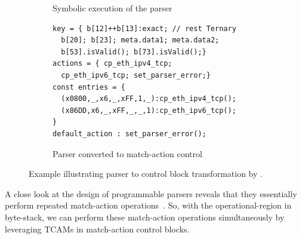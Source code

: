 \documentclass[letterpaper,twocolumn,10pt]{article}
\begin{document}
\begin{figure}[!ht]
\begin{subfigure}[b]{0.26\linewidth}
        \caption{Symbolic execution of the parser}
        \label{subfig:parser-symbolic-execution}
    \end{subfigure}
    \begin{subfigure}[b]{.47\linewidth}
    \centering
    \begin{lstlisting}[frame=none]
key = { b[12]++b[13]:exact; // rest Ternary
  b[20]; b[23]; meta.data1; meta.data2;
  b[53].isValid(); b[73].isValid();}
actions = { cp_eth_ipv4_tcp;
  cp_eth_ipv6_tcp; set_parser_error;}
const entries = {
  (x0800,_,x6,_,xFF,1,_):cp_eth_ipv4_tcp();
  (x86DD,x6,_,xFF,_,_,1):cp_eth_ipv6_tcp();
}
default_action : set_parser_error();
\end{lstlisting}
\vspace*{-10pt}
\caption{Parser converted to match-action control}
\label{subfig:parser-mat}
\end{subfigure}
\caption{Example illustrating parser to control block transformation
by \ucomp.}
\label{fig:parser-to-control-block-transformation}
\end{figure}

%
A close look at the design of programmable parsers reveals that they
essentially perform repeated match-action operations~\cite{6665172}.
So, with the operational-region in byte-stack, we can perform these
match-action operations simultaneously by leveraging  TCAMs in
match-action control blocks.
\end{document}
